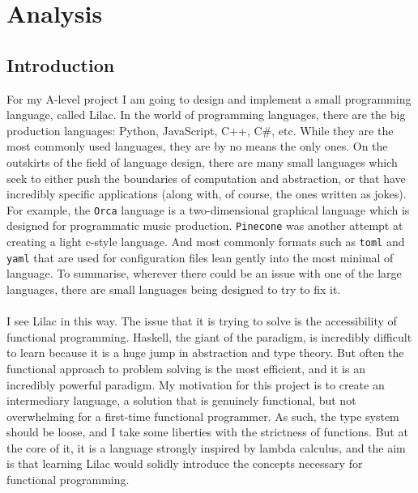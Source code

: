\documentclass[a4paper, 11pt]{report}
\begin{document}
\newcommand{\coderef}[2]{(\ref{#1}\ l.#2)}
\newcommand{\comment}[1]{}


\newpage

\tableofcontents
\newpage

\chapter{Analysis}\label{sec:analysis}
\section{Introduction}\label{sec:introduction}

For my A-level project I am going to design and implement a small programming language, called Lilac. In the world of programming languages, there are the big production languages: Python, JavaScript, C++, C\#, etc. While they are the most commonly used languages, they are by no means the only ones. On the outskirts of the field of language design, there are many small languages which seek to either push the boundaries of computation and abstraction, or that have incredibly specific applications (along with, of course, the ones written as jokes). For example, the \verb|Orca| language is a two-dimensional graphical language which is designed for programmatic music production. \verb|Pinecone| was another attempt at creating a light c-style language. And most commonly formats such as \verb|toml| and \verb|yaml| that are used for configuration files lean gently into the most minimal of language. To summarise, wherever there could be an issue with one of the large languages, there are small languages being designed to try to fix it.\\
\\
I see Lilac in this way. The issue that it is trying to solve is the accessibility of functional programming. Haskell, the giant of the paradigm, is incredibly difficult to learn because it is a huge jump in abstraction and type theory. But often the functional approach to problem solving is the most efficient, and it is an incredibly powerful paradigm. My motivation for this project is to create an intermediary language, a solution that is genuinely functional, but not overwhelming for a first-time functional programmer. As such, the type system should be loose, and I take some liberties with the strictness of functions. But at the core of it, it is a language strongly inspired by lambda calculus, and the aim is that learning Lilac would solidly introduce the concepts necessary for functional programming.\\
\\
\end{document}
